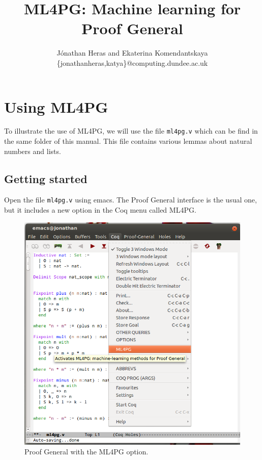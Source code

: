 \documentclass[10pt]{article}
\begin{document}
\title{ML4PG: Machine learning for Proof General}
\author{J\'onathan Heras and Ekaterina Komendantskaya\\
\{jonathanheras,katya\}@computing.dundee.ac.uk}
 \maketitle
 
 
 
\tableofcontents 
 

\section{Using ML4PG}


To illustrate the use of ML4PG, we will use the file \verb"ml4pg.v" which can be find in the same folder of this manual.
This file contains various lemmas about natural numbers and lists.

\subsection{Getting started}

Open the file \verb"ml4pg.v" using emacs. The Proof General interface is the usual one, but it includes a new option in the Coq menu
called ML4PG.

\begin{figure}
 \centering
 \includegraphics[scale=0.4]{images/fig1pg.png}
 \caption{Proof General with the ML4PG option.}\label{fig1}
\end{figure}
\end{document}

